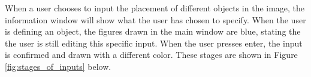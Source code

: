 



When a user chooses to input the  placement of different objects in the image, the information window will show what the user has chosen to specify. When the user is defining an object, the figures drawn in the main window are blue, stating the the user is still editing this specific input. When the user presses enter, the input is confirmed and drawn with a different color. These stages are shown in Figure \ref{fig:stages_of_inputs} below. 


